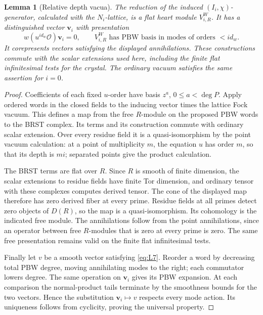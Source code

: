 \documentclass[11pt]{article}
\numberwithin{equation}{section}
\newtheorem{lemma}[theorem]{Lemma}
\theoremstyle{definition}
\theoremstyle{remark}
\begin{document}
\begin{lemma}[Relative depth vacua]\label{walg:vacua}
The reduction of the induced \((I_i,\chi)\)-generator, calculated
with the \(N_i\)-lattice, is a flat heart module \(V_{i,R}^W\).
It has a distinguished vector \(\mathbf v_i\) with presentation
\begin{equation}\label{eq:L7}
 w(u^{i d_w}\mathcal O)\mathbf v_i=0,
 \qquad
 V_{i,R}^W\text{ has PBW basis in modes of orders }<i d_w.
\end{equation}
It corepresents vectors satisfying the displayed annihilations.
These constructions commute with the scalar extensions used here,
including the finite flat infinitesimal tests for the crystal.
The ordinary vacuum satisfies the same assertion for \(i=0\).
\end{lemma}

\begin{proof}
Coefficients of each fixed \(u\)-order have basis
\(z^a\), \(0\leq a<\deg P\).  Apply ordered words in the closed
fields to the inducing vector times the lattice Fock vacuum.
This defines a map from the free \(R\)-module on the proposed PBW
words to the BRST complex.  Its terms and its construction commute
with ordinary scalar extension.  Over every residue field it is a
quasi-isomorphism by the point vacuum calculation: at a point of
multiplicity \(m\), the equation \(u\) has order \(m\), so that
its depth is \(mi\); separated points give the product calculation.

The BRST terms are flat over \(R\).  Since \(R\) is smooth of finite
dimension, the scalar extensions to residue fields have finite Tor
dimension, and ordinary tensor with these complexes computes derived
tensor.  The cone of the displayed map therefore has zero derived
fiber at every prime.  Residue fields at all primes detect zero
objects of \(D(R)\), so the map is a quasi-isomorphism.  Its
cohomology is the indicated free module.  The annihilations follow
from the point annihilations, since an operator between free
\(R\)-modules that is zero at every prime is zero.  The same free
presentation remains valid on the finite flat infinitesimal tests.

Finally let \(v\) be a smooth vector satisfying \eqref{eq:L7}.
Reorder a word by decreasing total PBW degree, moving annihilating
modes to the right; each commutator lowers degree.  The same operation
on \(\mathbf v_i\) gives its PBW expansion.  At each comparison the
normal-product tails terminate by the smoothness bounds for the two
vectors.  Hence the substitution \(\mathbf v_i\mapsto v\) respects
every mode action.  Its uniqueness follows from cyclicity, proving
the universal property.
\end{proof}
\end{document}
